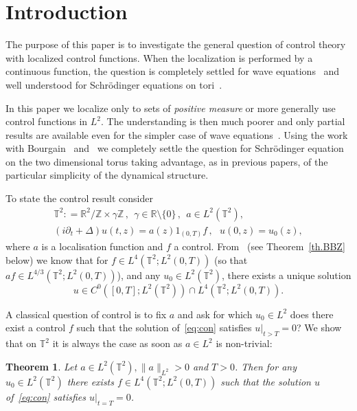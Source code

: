 \documentclass[11pt]{article}
\newtheorem{theo}{Theorem}[section]
\theoremstyle{definition}
\numberwithin{equation}{section}
\numberwithin{figure}{section}
\numberwithin{table}{section}
\newcommand{\R}{{\mathbb R}}
\newcommand{\TT}{{\mathbb T}}
\newcommand{\ZZ}{{\mathbb Z}}
\begin{document}
\section{Introduction}\label{in}

The purpose of this paper is to investigate the general question of control theory with localized control functions. When the localization is performed by a continuous function, the question is completely settled for wave equations~\cite{BLR,BG} and well understood for Schrödinger equations on tori~\cite{Ha, Ja, Ko, BZ4, AM}.

In this paper we localize only to sets of \emph{positive measure} or more generally use control functions in $ L^2 $. The understanding is then much poorer and only partial results are available even for the simpler case of wave equations~\cite{Bu16,Bu17}. Using the work with Bourgain~\cite{BBZ} and~\cite{BZ4} we completely settle the question for Schrödinger equation on the two dimensional torus taking advantage, as in previous papers, of the particular simplicity of the dynamical structure.


To state the control result consider
\begin{equation}\label{eq:con}
\begin{gathered} \TT^2 : = \R^2 / \ZZ \times \gamma \ZZ \,, \ \ \gamma \in \R \setminus \{
0 \}\,, \ \ a \in L^2 (\TT^2), \\
(i \partial_t + \Delta) u (t, z) = a(z) 1_{(0,T)}f \,, \ \ \ u (0, z) =u_0 (z),
\end{gathered}
\end{equation}
where $a $ is a localisation function and $f$ a control. From~\cite[Proposition~2.2]{BBZ} (see Theorem~\ref{th.BBZ} below) we know that for $f \in L^{4}(\TT^2 ; L^2(0,T))$ (so that $af \in L^{4/3}(\TT^2 ; L^2(0,T))$), and any $u_0 \in L^2(\TT^2)$, there exists a unique solution
\[
u \in C^0 ([0,T]; L^2(\TT^2)) \cap L^4 (\TT^2; L^2(0,T)).
\]

A classical question of control is to fix $ a $ and ask for which $u_0 \in L^2$ does there exist a control $f$ such that the solution of~\eqref{eq:con} satisfies $u |_{t>T} =0$? We show that on $\mathbb{T}^2$ it is always the case as soon as $a \in L^2$ is non-trivial:

\begin{theo}\label{th.2}
Let $a \in L^2(\TT^2), \| a \|_{L^2} >0$ and $ T > 0 $. Then for any $u_0\in L^2(\TT^2)$ there exists $f \in L^4(\TT^2 ; L^2(0,T))$ such that the solution $u$ of~\eqref{eq:con} satisfies $u |_{t=T} =0$.
\end{theo}
\end{document}
